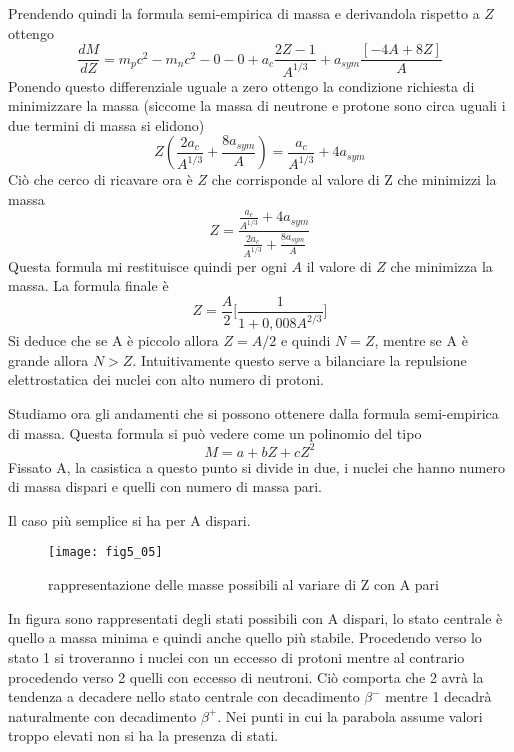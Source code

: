 Prendendo quindi la formula semi-empirica di massa e derivandola rispetto a $Z$ ottengo
\begin{equation}
\frac{dM}{dZ}=m_pc^2-m_nc^2-0-0+a_c\frac{2Z-1}{A^{1/3}}+a_{sym}\frac{[-4A+8Z]}{A}
\end{equation}
Ponendo questo differenziale uguale a zero ottengo la condizione richiesta di minimizzare la massa (siccome la massa di neutrone e protone sono circa uguali i due termini di massa si elidono)
\begin{equation}
Z\left(\frac{2a_c}{A^{1/3}}+\frac{8a_{sym}}{A}\right)=\frac{a_c}{A^{1/3}}+4a_{sym}
\end{equation}
Ciò che cerco di ricavare ora è $Z$ che corrisponde al valore di Z che minimizzi la massa
\begin{equation}
Z=\frac{\frac{a_c}{A^{1/3}}+4a_{sym}}{\frac{2a_c}{A^{1/3}}+\frac{8a_{sym}}{A}}
\end{equation}
Questa formula mi restituisce quindi per ogni $A$ il valore di $Z$ che minimizza la massa.
La formula finale è
\begin{equation}
Z=\frac{A}{2}\biggl[\frac{1}{1+0,008A^{2/3}}\biggl]
\end{equation}
Si deduce che se A è piccolo allora $Z=A/2$ e quindi $N=Z$, mentre se A è grande allora $N>Z$.
Intuitivamente questo serve a bilanciare la repulsione elettrostatica dei nuclei con alto numero di protoni.

Studiamo ora gli andamenti che si possono ottenere dalla formula semi-empirica di massa.
Questa formula si può vedere come un polinomio del tipo
\begin{equation}
M=a+ bZ +cZ^2
\end{equation}
Fissato A, la casistica a questo punto si divide in due, i nuclei che hanno numero di massa dispari e quelli con numero di massa pari.

Il caso più semplice si ha per A dispari.
\begin{figure}[h]
\centering
\texttt{[image: fig5\_05]}
\caption{rappresentazione delle masse possibili al variare di Z con A pari}
\end{figure}
In figura sono rappresentati degli stati possibili con A dispari, lo stato centrale è quello a massa minima e quindi anche quello più stabile.
Procedendo verso lo stato 1 si troveranno i nuclei con un eccesso di protoni mentre al contrario procedendo verso 2 quelli con eccesso di neutroni.
Ciò comporta che 2 avrà la tendenza a decadere nello stato centrale con decadimento  $\beta^-$ mentre 1 decadrà naturalmente con decadimento $\beta^+$.
Nei punti in cui  la parabola assume valori troppo elevati non si ha la presenza di stati.

